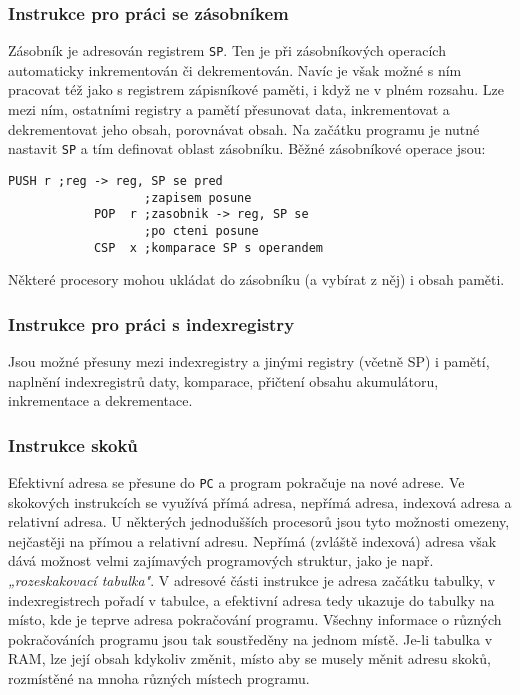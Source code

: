         \subsubsection{Instrukce pro práci se zásobníkem} 
          Zásobník je adresován registrem \texttt{SP}. Ten je při zásobníkových operacích 
          automaticky inkrementován či dekrementován. Navíc je však možné s ním pracovat též jako s 
          registrem zápisníkové paměti, i když ne v plném rozsahu. Lze mezi ním, ostatními registry 
          a pamětí přesunovat data, inkrementovat a dekrementovat jeho obsah, porovnávat obsah. Na 
          začátku programu je nutné nastavit \texttt{SP} a tím definovat oblast zásobníku. Běžné 
          zásobníkové operace jsou:
          \begin{lstlisting}[gobble=10]
            PUSH r ;reg -> reg, SP se pred 
                   ;zapisem posune
            POP  r ;zasobnik -> reg, SP se 
                   ;po cteni posune
            CSP  x ;komparace SP s operandem
          \end{lstlisting}
          Některé procesory mohou ukládat do zásobníku (a vybírat z něj) i obsah paměti.
          
        \subsubsection{Instrukce pro práci s indexregistry}
          Jsou možné přesuny mezi indexregistry a jinými registry (včetně SP) i pamětí, naplnění 
          indexregistrů daty, komparace, přičtení obsahu akumulátoru, inkrementace a dekrementace.
          
        \subsubsection{Instrukce skoků}
          Efektivní adresa se přesune do \texttt{PC} a program pokračuje na nové adrese. Ve 
          skokových instrukcích se využívá přímá adresa, nepřímá adresa, indexová adresa a 
          relativní adresa. U některých jednodušších procesorů jsou tyto možnosti omezeny, 
          nejčastěji na přímou a relativní adresu. Nepřímá (zvláště indexová) adresa však dává 
          možnost velmi zajímavých programových struktur, jako je např. \emph{„rozeskakovací 
          tabulka"}. V adresové části instrukce je adresa začátku tabulky, v indexregistrech pořadí 
          v tabulce, a efektivní adresa tedy ukazuje do tabulky na místo, kde je teprve adresa 
          pokračování programu. Všechny informace o různých pokračováních programu jsou tak 
          soustředěny na jednom místě. Je-li tabulka v RAM, lze její obsah kdykoliv změnit, místo 
          aby se musely měnit adresu skoků, rozmístěné na mnoha různých místech programu.
          
